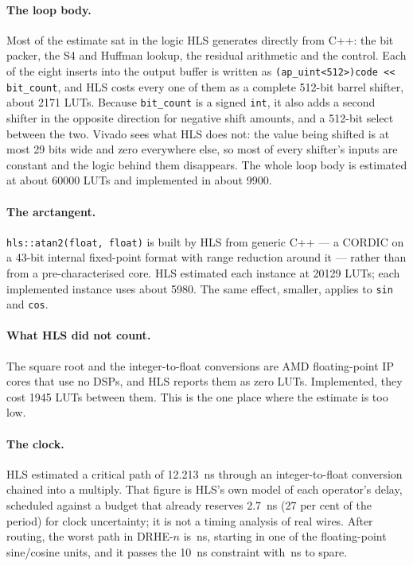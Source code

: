 \paragraph{The loop body.} Most of the estimate sat in the logic HLS generates
directly from C++: the bit packer, the S4 and Huffman lookup, the residual
arithmetic and the control. Each of the eight inserts into the output buffer is
written as \texttt{(ap\_uint<512>)code << bit\_count}, and HLS costs every one
of them as a complete 512-bit barrel shifter, about \num{2171} LUTs. Because
\texttt{bit\_count} is a signed \texttt{int}, it also adds a second shifter in
the opposite direction for negative shift amounts, and a 512-bit select between
the two. Vivado sees what HLS does not: the value being shifted is at most 29
bits wide and zero everywhere else, so most of every shifter's inputs are
constant and the logic behind them disappears. The whole loop body is estimated
at about \num{60000} LUTs and implemented in about \num{9900}.

\paragraph{The arctangent.} \texttt{hls::atan2(float, float)} is built by HLS
from generic C++ --- a CORDIC on a 43-bit internal fixed-point format with range
reduction around it --- rather than from a pre-characterised core. HLS
estimated each instance at \num{20129} LUTs; each implemented instance uses
about \num{5980}. The same effect, smaller, applies to \texttt{sin} and
\texttt{cos}.

\paragraph{What HLS did not count.} The square root and the integer-to-float
conversions are AMD floating-point IP cores that use no DSPs, and HLS reports
them as zero LUTs. Implemented, they cost \num{1945} LUTs between them. This is
the one place where the estimate is too low.

\paragraph{The clock.} HLS estimated a critical path of
\SI{12.213}{\nano\second} through an integer-to-float conversion chained into a
multiply. That figure is HLS's own model of each operator's delay, scheduled
against a budget that already reserves \SI{2.7}{\nano\second} (27 per cent of
the period) for clock uncertainty; it is not a timing analysis of real wires.
After routing, the worst path in DRHE-$n$ is \,ns, starting in one of the floating-point sine/cosine units, and it passes the
\SI{10}{\nano\second} constraint with \,ns to spare.

